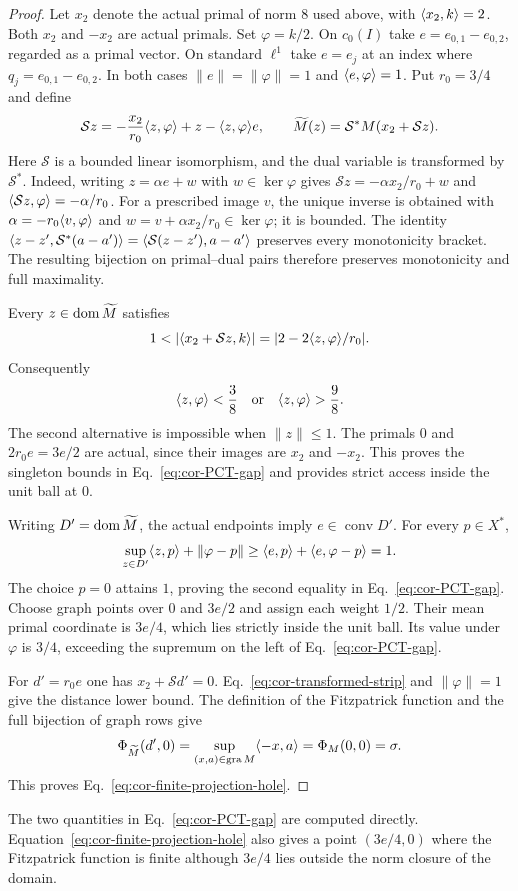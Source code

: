 \begin{proof}
Let $x_2$ denote the actual primal of norm $8$ used above, with
$\langle x_2,k\rangle=2$. Both $x_2$ and $-x_2$ are actual primals.
Set $\varphi=k/2$. On $c_0(I)$ take
$e=e_{0,1}-e_{0,2}$, regarded as a primal vector. On standard
$\ell^1$ take $e=e_j$ at an index where
$q_j=e_{0,1}-e_{0,2}$. In both cases
$\|e\|=\|\varphi\|=1$ and $\langle e,\varphi\rangle=1$.
Put $r_0=3/4$ and define
\[
\mathcal S z=-\frac{x_2}{r_0}\langle z,\varphi\rangle
                 +z-\langle z,\varphi\rangle e,
\qquad
\widetilde M(z)=\mathcal S^*M(x_2+\mathcal S z).
\]
Here $\mathcal S$ is a bounded linear isomorphism, and the dual variable
is transformed by $\mathcal S^*$. Indeed, writing $z=\alpha e+w$ with $w\in\ker\varphi$
gives $\mathcal S z=-\alpha x_2/r_0+w$ and
$\langle \mathcal S z,\varphi\rangle=-\alpha/r_0$. For a prescribed
image $v$, the unique inverse is obtained with
$\alpha=-r_0\langle v,\varphi\rangle$ and
$w=v+\alpha x_2/r_0\in\ker\varphi$; it is bounded.
The identity $\langle z-z',\mathcal S^*(a-a')\rangle
=\langle \mathcal S(z-z'),a-a'\rangle$ preserves every monotonicity bracket.
The resulting bijection on primal--dual pairs therefore preserves
monotonicity and full maximality.

Every $z\in\operatorname{dom}\widetilde M$ satisfies
\[
1<|\pair{x_2+\mathcal S z}{k}|
  =|2-2\pair{z}{\varphi}/r_0|.
\]
Consequently
\begin{equation}
\langle z,\varphi\rangle<\frac38
\quad\text{or}\quad
\langle z,\varphi\rangle>\frac98.
\label{eq:cor-transformed-strip}
\end{equation}
The second alternative is impossible when $\|z\|\le1$.
The primals $0$ and $2r_0e=3e/2$ are actual, since their images
are $x_2$ and $-x_2$. This proves the singleton bounds in
Eq.~\eqref{eq:cor-PCT-gap} and provides strict access inside the
unit ball at $0$.

Writing $D'=\operatorname{dom}\widetilde M$, the actual endpoints imply
$e\in\operatorname{conv}D'$. For every $p\in X^*$,
\[
\sup_{z\in D'}\langle z,p\rangle+\|\varphi-p\|
\ge\langle e,p\rangle+\langle e,\varphi-p\rangle=1.
\]
The choice $p=0$ attains $1$, proving the second equality in
Eq.~\eqref{eq:cor-PCT-gap}. Choose graph points over $0$ and $3e/2$
and assign each weight $1/2$. Their mean primal coordinate is $3e/4$,
which lies strictly inside the unit ball. Its value under $\varphi$
is $3/4$, exceeding the supremum on the left of
Eq.~\eqref{eq:cor-PCT-gap}.

For $d'=r_0e$ one has $x_2+\mathcal S d'=0$.
Eq.~\eqref{eq:cor-transformed-strip} and $\|\varphi\|=1$
give the distance lower bound. The definition of the Fitzpatrick
function and the full bijection of graph rows give
\[
\Phi_{\widetilde M}(d',0)
=\sup_{(x,a)\in\operatorname{gra} M}\langle -x,a\rangle
=\Phi_M(0,0)=\sigma.
\]
This proves Eq.~\eqref{eq:cor-finite-projection-hole}.
\end{proof}
The two quantities in Eq.~\eqref{eq:cor-PCT-gap} are computed directly.
Equation~\eqref{eq:cor-finite-projection-hole} also gives a point
$(3e/4,0)$ where the Fitzpatrick function is finite although $3e/4$
lies outside the norm closure of the domain.

